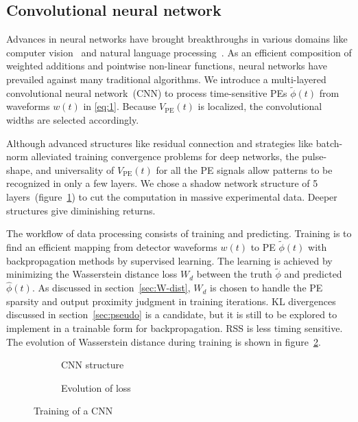 \subsection{Convolutional neural network}

Advances in neural networks have brought breakthroughs in various domains like computer vision~\cite{he_deep_2015} and natural language processing~\cite{vaswani_attention_2017}. As an efficient composition of weighted additions and pointwise non-linear functions, neural networks have prevailed against many traditional algorithms. We introduce a multi-layered convolutional neural network~(CNN) to process time-sensitive PEs $\tilde{\phi}(t)$ from waveforms $w(t)$ in \eqref{eq:1}.  Because $V_\mathrm{PE}(t)$ is localized, the convolutional widths are selected accordingly.

Although advanced structures like residual connection and strategies like batch-norm alleviated training convergence problems for deep networks, the pulse-shape, and universality of $V_\mathrm{PE}(t)$ for all the PE signals allow patterns to be recognized in only a few layers.  We chose a shadow network structure of 5 layers~(figure~\ref{fig:struct}) to cut the computation in massive experimental data.  Deeper structures give diminishing returns.

The workflow of data processing consists of training and predicting. Training is to find an efficient mapping from detector waveforms $w(t)$ to PE $\tilde{\phi}(t)$ with backpropagation methods by supervised learning.  The learning is achieved by minimizing the Wasserstein distance loss $W_d$ between the truth $\tilde{\phi}$ and predicted $\hat{\phi}(t)$.  As discussed in section~\ref{sec:W-dist}, $W_d$ is chosen to handle the PE sparsity and output proximity judgment in training iterations.  KL divergences discussed in section~\ref{sec:pseudo} is a candidate, but it is still to be explored to implement in a trainable form for backpropagation.  RSS is less timing sensitive.  The evolution of Wasserstein distance during training is shown in figure~\ref{fig:loss}.

\begin{figure}[H]
  \begin{subfigure}{0.35\textwidth}
    \centering
    \begin{adjustbox}{width=0.65\textwidth}
      
    \end{adjustbox}
    \caption{\label{fig:struct} CNN structure}
  \end{subfigure}
  \begin{subfigure}{0.6\textwidth}
    \centering
    \resizebox{\textwidth}{!}{}
    \caption{\label{fig:loss} Evolution of loss}
  \end{subfigure}
  \caption{\label{fig:CNN} Training of a CNN}
\end{figure}


